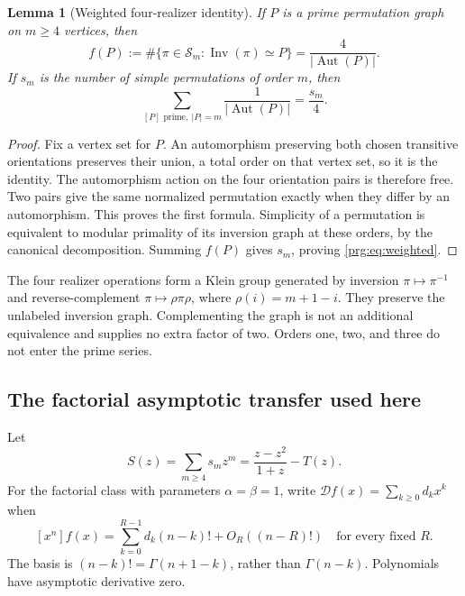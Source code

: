 \documentclass[11pt,letterpaper]{article}
\numberwithin{equation}{section}
\newtheorem{lemma}[theorem]{Lemma}
\theoremstyle{definition}\newtheorem{definition}[theorem]{Definition}
\theoremstyle{remark}\newtheorem{remark}[theorem]{Remark}
\DeclareMathOperator{\Aut}{Aut}
\DeclareMathOperator{\Inv}{Inv}
\begin{document}
\begin{lemma}[Weighted four-realizer identity]\label{prg:lem:weighted}
If $P$ is a prime permutation graph on $m\geq4$ vertices, then
\[
 f(P):=\#\{\pi\in\mathcal S_m:\Inv(\pi)\simeq P\}
       =\frac4{|\Aut(P)|}.
\]
If $s_m$ is the number of simple permutations of order $m$, then
\begin{equation}\label{prg:eq:weighted}
 \sum_{[P]\text{ prime},\ |P|=m}\frac1{|\Aut(P)|}=\frac{s_m}{4}.
\end{equation}
\end{lemma}
\begin{proof}
Fix a vertex set for $P$. An automorphism preserving both chosen
transitive orientations preserves their union, a total order on
that vertex set, so it is the identity. The automorphism action on
the four orientation pairs is therefore free. Two pairs give the
same normalized permutation exactly when they differ by an
automorphism. This proves the first formula. Simplicity of a
permutation is equivalent to modular primality of its inversion
graph at these orders, by the canonical decomposition. Summing
$f(P)$ gives $s_m$, proving \eqref{prg:eq:weighted}.
\end{proof}

The four realizer operations form a Klein group generated by
inversion $\pi\mapsto\pi^{-1}$ and reverse-complement
$\pi\mapsto\rho\pi\rho$, where $\rho(i)=m+1-i$. They preserve the
unlabeled inversion graph. Complementing the graph is not an
additional equivalence and supplies no extra factor of two.
Orders one, two, and three do not enter the prime series.

\subsection{The factorial asymptotic transfer used here}\label{prg:sec:borinsky}
Let
\begin{equation}\label{prg:eq:S}
 S(z)=\sum_{m\geq4}s_mz^m=\frac{z-z^2}{1+z}-T(z).
\end{equation}
For the factorial class with parameters $\alpha=\beta=1$, write
$\mathcal D f(x)=\sum_{k\geq0}d_kx^k$ when
\[
 [x^n]f(x)=\sum_{k=0}^{R-1}d_k(n-k)!+O_R((n-R)!)
 \quad\text{for every fixed }R.
\]
The basis is $(n-k)!=\Gamma(n+1-k)$, rather than
$\Gamma(n-k)$. Polynomials have asymptotic derivative zero.
\end{document}
